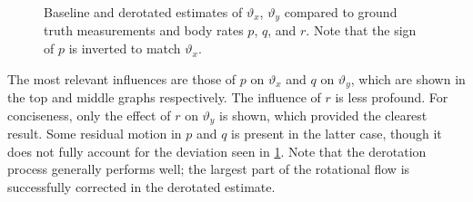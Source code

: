 \begin{figure}[!ht]
	\centering
  	\setlength{\fwidth}{0.4\linewidth}
	
	\caption{Baseline and derotated estimates of $\vartheta_x$, $\vartheta_y$ compared to ground truth measurements and body rates $p$, $q$, and $r$. Note that the sign of $p$ is inverted to match $\vartheta_x$.}
	\label{fig:derotation}
\end{figure}

The most relevant influences are those of $p$ on $\vartheta_x$ and $q$ on $\vartheta_y$, which are shown in the top and middle graphs respectively. The influence of $r$ is less profound. For conciseness, only the effect of $r$ on $\vartheta_y$ is shown, which provided the clearest result. Some residual motion in $p$ and $q$ is present in the latter case, though it does not fully account for the deviation seen in \cref{fig:derotation}. Note that the derotation process generally performs well; the largest part of the rotational flow is successfully corrected in the derotated estimate. 

